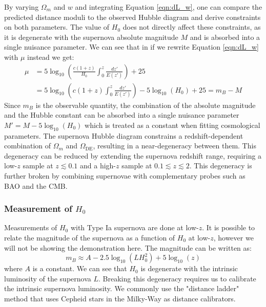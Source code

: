 By varying $\Omega_m$ and $w$ and integrating Equation \ref{eqn:dL_w}, 
one can compare the predicted distance moduli to the observed Hubble 
diagram and derive constraints on both parameters. The value of $H_0$ 
does not directly affect these constraints, as it is degenerate with 
the supernova absolute magnitude $M$ and is absorbed into a single 
nuisance parameter. We can see that in if we rewrite Equation \ref{eqn:dL_w} with $\mu$ instead we get:
\begin{align}
    \mu &= 
    5\log_{10}\left(\frac{c(1+z)}{H_0} \int_{0}^{z} \frac{dz'}{E(z')}\right) + 25 \\
    &= 5\log_{10}\left(c(1+z) \int_{0}^{z} \frac{dz'}{E(z')}\right) -5 \log_{10} (H_0) + 25 = m_B - M
\end{align}
Since $m_B$ is the observable quantity, the combination of the absolute magnitude and the Hubble constant can be absorbed into a single nuisance parameter 
$M' = M - 5 \log_{10} (H_0)$ which is treated as a constant when fitting cosmological parameters. 
The supernova Hubble diagram constrains a redshift-dependent combination 
of $\Omega_m$ and $\Omega_{\text{DE}}$, resulting in a near-degeneracy 
between them. This degeneracy can be reduced by extending the supernova 
redshift range, requiring a low-$z$ sample at $z \lesssim 0.1$  and a high-$z$ sample at 
$0.1 \lesssim z \lesssim 2$. This degeneracy is further broken by combining supernovae with 
complementary probes such as BAO and the CMB.

\subsubsection{Measurement of $H_0$}

Measurements of $H_0$ with Type Ia supernova are done at low-$z$. It is possible to relate the magnitude of the supernova as a function of $H_0$ at low-$z$, however we 
will not be showing the demonstration here. The magnitude can be written as:
\begin{equation}
    m_B \approx A - 2.5\log_{10}(L H_0^2) + 5 \log_{10}(z)
\end{equation}
where $A$ is a constant. We can see that $H_0$ is degenerate with the 
intrinsic luminosity of the supernova $L$. Breaking this degeneracy requires us to calibrate the intrinsic supernova luminosity. 
We commonly use the "distance ladder" method that 
uses Cepheid stars in the Milky-Way as distance calibrators. \\

